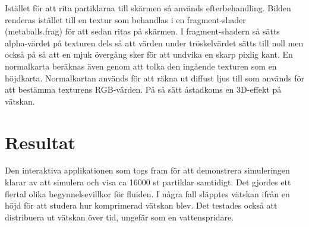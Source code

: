 \documentclass[a4paper,12pt,oneside,final]{extarticle}
\begin{document}
Istället för att rita partiklarna till skärmen så används efterbehandling.
Bilden renderas istället till en textur som behandlas i en fragment-shader (metaballs.frag) för att sedan ritas på skärmen.
I fragment-shadern så sätts alpha-värdet på texturen dels så att värden under tröskelvärdet sätts till noll men också på så att en mjuk övergång sker för att undvika en skarp pixlig kant.
En normalkarta beräknas även genom att tolka den ingående texturen som en höjdkarta.
Normalkartan används för att räkna ut diffust ljus till som används för att bestämma texturens RGB-värden.
På så sätt åstadkoms en 3D-effekt på vätskan.
\clearpage

\section{Resultat}
Den interaktiva applikationen som togs fram för att demonstrera simuleringen klarar av att simulera och visa ca 16000 st partiklar samtidigt.
Det gjordes ett flertal olika begynnelsevillkor för fluiden.
I några fall släpptes vätskan ifrån en höjd för att studera hur komprimerad vätskan blev.
Det testades också att distribuera ut vätskan över tid, ungefär som en vattenspridare.
\end{document}
